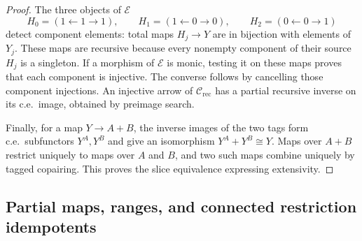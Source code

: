 \documentclass[11pt]{article}
\begin{document}
\begin{proof}
The three objects of $\mathcal E$
\[
 H_0=(1\leftarrow1\to1),\qquad
 H_1=(1\leftarrow0\to0),\qquad
 H_2=(0\leftarrow0\to1)
\]
detect component elements: total maps $H_j\to Y$ are in bijection
with elements of $Y_j$. These maps are recursive because every
nonempty component of their source $H_j$ is a singleton.
If a morphism of $\mathcal E$ is monic,
testing it on these maps proves that each component is injective.
The converse follows by cancelling those component injections.
An injective arrow of $\mathcal C_{\mathrm{rec}}$ has a partial recursive inverse
on its c.e.\ image, obtained by preimage search.

Finally, for a map $Y\to A+B$, the inverse images of the two
tags form c.e.\ subfunctors $Y^A,Y^B$ and give an isomorphism
$Y^A+Y^B\cong Y$. Maps over $A+B$ restrict uniquely to maps
over $A$ and $B$, and two such maps combine uniquely by tagged
copairing. This proves the slice equivalence expressing extensivity.
\end{proof}

\subsection{Partial maps, ranges, and connected restriction idempotents}
\end{document}
